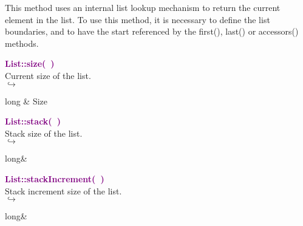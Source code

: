 This method uses an internal list lookup mechanism to return the current element in the list.
To use this method, it is necessary to define the list boundaries, and to have the start referenced by the first(), last() or accessors() methods.

\textcolor{purple}{\textbf{List::size(~)}}\label{List::size()}\\
Current size of the list.\\ \hspace*{5mm}$\hookrightarrow$
\vspace*{-2em}\begin{tcolorbox}[grow to left by=-1cm, width=\textwidth-1cm,myArgs,tabularx={l|R}]
long & Size
\end{tcolorbox}


\textcolor{purple}{\textbf{List::stack(~)}}\label{List::stack()}\\
Stack size of the list.\\ \hspace*{5mm}$\hookrightarrow$
\vspace*{-2em}\begin{tcolorbox}[grow to left by=-1cm, width=\textwidth-1cm,myArgs,tabularx={l|R}]
long&
\end{tcolorbox}


\textcolor{purple}{\textbf{List::stackIncrement(~)}}\label{List::stackIncrement()}\\
Stack increment size of the list.\\ \hspace*{5mm}$\hookrightarrow$
\vspace*{-2em}\begin{tcolorbox}[grow to left by=-1cm, width=\textwidth-1cm,myArgs,tabularx={l|R}]
long&
\end{tcolorbox}


